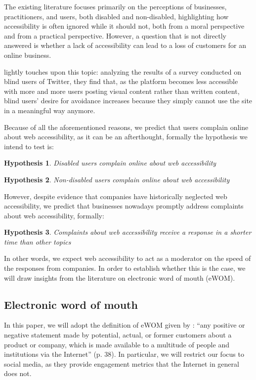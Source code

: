 \documentclass[12pt, a4paper]{article}
\newtheorem{hyp}{Hypothesis}
\begin{document}
The existing literature focuses primarily on the perceptions of businesses,
practitioners, and users, both disabled and non-disabled, highlighting how
accessibility is often ignored while it should not, both from a moral perspective and
from a practical perspective. However, a question that is not directly answered is
whether a lack of accessibility can lead to a loss of customers for an online business.

 lightly touches upon this topic: analyzing the results of a survey
conducted on blind users of Twitter, they find that, as the platform becomes less
accessible with more and more users posting visual content rather than written content,
blind users' desire for avoidance increases because they simply cannot use the site in a
meaningful way anymore.

Because of all the aforementioned reasons, we predict that users complain online about
web accessibility, as it can be an afterthought, formally the hypothesis we intend to
test is:

\begin{hyp}
  Disabled users complain online about web accessibility
\end{hyp}
\begin{hyp}
  Non-disabled users complain online about web accessibility
\end{hyp}

However, despite evidence that companies have historically neglected web accessibility,
we predict that businesses nowadays promptly address complaints about web
accessibility, formally:

\begin{hyp}
  Complaints about web accessibility receive a response in a shorter time than other topics
\end{hyp}

In other words, we expect web accessibility to act as a moderator on the speed of the
responses from companies. In order to establish whether this is the case, we will draw
insights from the literature on electronic word of mouth (eWOM).

\subsection{Electronic word of mouth}\label{sec:ewom}

In this paper, we will adopt the definition of eWOM given by :
``any positive or negative statement made by potential, actual, or former customers
about a product or company, which is made available to a multitude of people and
institutions via the Internet'' (p. 38). In particular, we will restrict our focus to
social media, as they provide engagement metrics that the Internet in general does not.
\end{document}
